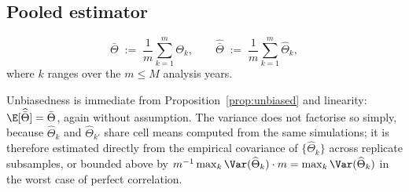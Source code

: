 \subsection{Pooled estimator}
\label{sec:align-pooled}

\begin{definition}
\begin{equation}
  \bar{\Theta} \;:=\; \frac{1}{m}\sum_{k=1}^{m} \Theta_k ,
  \qquad
  \widehat{\bar{\Theta}} \;:=\; \frac{1}{m}\sum_{k=1}^{m} \widehat{\Theta}_k ,
\end{equation}
where $k$ ranges over the $m \le M$ analysis years.
\end{definition}

\noindent
Unbiasedness is immediate from Proposition~\ref{prop:unbiased} and linearity:
$\E[\widehat{\bar{\Theta}}] = \bar{\Theta}$, again without assumption. The variance does not
factorise so simply, because $\widehat{\Theta}_k$ and $\widehat{\Theta}_{k'}$ share cell means
computed from the same simulations; it is therefore estimated directly from the empirical
covariance of $\{\widehat{\Theta}_k\}$ across replicate subsamples, or bounded above by
$m^{-1}\max_k \Var(\widehat{\Theta}_k) \cdot m = \max_k \Var(\widehat{\Theta}_k)$ in the worst case
of perfect correlation.
